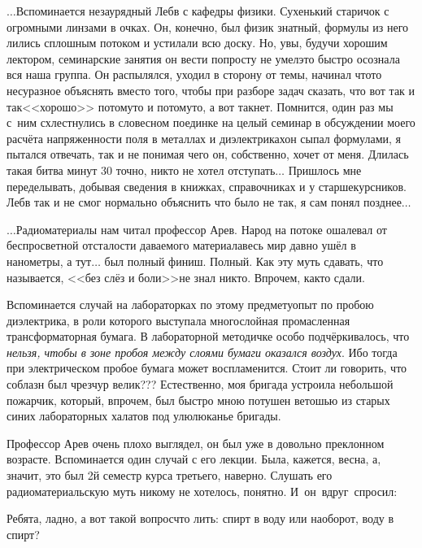 $\ldots$Вспоминается незаурядный Леб\sdash в с кафедры физики. Сухенький старичок с огромными линзами в очках. Он, конечно, был физик знатный, формулы из него лились сплошным потоком и устилали всю доску. Но, увы, будучи хорошим лектором, семинарские занятия он вести попросту не умел\mdash это быстро осознала вся наша группа. Он распылялся, уходил в сторону от темы, начинал что\sdash то несуразное объяснять вместо того, чтобы при разборе задач сказать, что вот так и так\mdash <<хорошо>> потому\sdash то и потому\sdash то, а вот так\mdash нет. Помнится, один раз мы с~ним схлестнулись в словесном поединке на целый семинар в обсуждении моего расчёта напряженности поля в металлах и диэлектриках\mdash он сыпал формулами, я пытался отвечать, так и не понимая чего он, собственно, хочет от меня. Длилась такая битва минут 30 точно, никто не хотел отступать$\ldots$ Пришлось мне переделывать, добывая сведения в книжках, справочниках и у старшекурсников. Леб\sdash в так и не смог нормально объяснить что было не так, я сам понял позднее$\ldots$

\vspace{1.0cm}

$\ldots$Радиоматериалы нам читал профессор Ар\sdash ев. Народ на потоке ошалевал от беспросветной отсталости даваемого материала\mdash весь мир давно ушёл в нанометры, а тут$\ldots$ был полный финиш. Полный. Как эту муть сдавать, что называется, <<без слёз и боли>>\mdash не знал никто. Впрочем, как\sdash то сдали. 

Вспоминается случай на лабораторках по этому предмету\mdash опыт по пробою диэлектрика, в роли которого выступала многослойная промасленная трансформаторная бумага. В лабораторной методичке особо подчёркивалось, что \textit{нельзя, чтобы в зоне пробоя между слоями бумаги оказался воздух}. Ибо тогда при электрическом пробое бумага может воспламенится. Стоит ли говорить, что соблазн был чрезчур велик??? Естественно, моя бригада устроила небольшой пожарчик, который, впрочем, был быстро мною потушен ветошью из старых синих лабораторных халатов под улюлюканье бригады.

Профессор Ар\sdash ев очень плохо выглядел, он был уже в довольно преклонном возрасте. Вспоминается один случай с его лекции. Была, кажется, весна, а, значит, это был 2\sdash й семестр курса третьего, наверно. Слушать его радиоматериальскую муть никому не хотелось, понятно. И~он~вдруг~спросил:

\diagdash Ребята, ладно, а вот такой вопрос\mdash что лить: спирт в воду или наоборот, воду в спирт?

